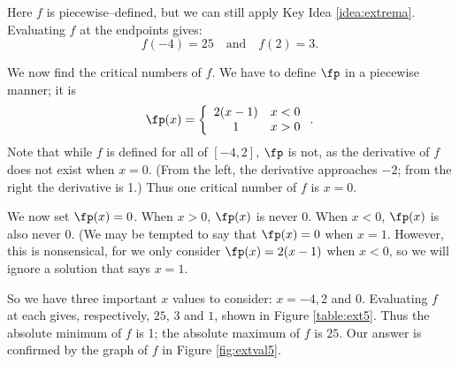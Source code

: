 {Here $f$ is piecewise--defined, but we can still apply Key Idea \ref{idea:extrema}. Evaluating $f$ at the endpoints gives: 
$$ f(-4) = 25 \quad \text{and} \quad f(2) = 3.$$

We now find the critical numbers of $f$. We have to define $\fp$ in a piecewise manner; it is $$\fp(x) =\left\{\begin{array}{cc} 2(x-1) & x < 0 \\ 1 & x>0 \end{array}\right. .$$ Note that while $f$ is defined for all of $[-4,2]$, $\fp$ is not, as the derivative of $f$ does not exist when $x=0$. (From the left, the derivative approaches $-2$; from the right the derivative is 1.) Thus one critical number of $f$ is $x=0$.

We now set $\fp(x) = 0$. When $x >0$, $\fp(x)$ is never 0.  When $x<0$, $\fp(x)$ is also never 0. (We may be tempted to say that $\fp(x) = 0 $ when $x=1$. However, this is nonsensical, for we only consider $\fp(x) = 2(x-1)$ when $x<0$, so we will ignore a solution that says $x=1$. 

So we have three important $x$ values to consider: $x= -4, 2$ and $0$. Evaluating $f$ at each gives, respectively, $25$, $3$ and $1$, shown in Figure \ref{table:ext5}. Thus the absolute minimum of $f$ is 1; the absolute maximum of $f$ is $25$. Our answer is confirmed by the graph of $f$ in Figure \ref{fig:extval5}.
}\\
\clearpage
{}
